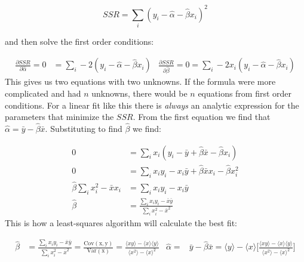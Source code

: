 \begin{equation}
SSR = \sum_i (y_i - \hat \alpha - \hat \beta x_i)^2
\end{equation}

and then solve the first order conditions:

\begin{align}
\frac{\partial SSR}{\partial \hat \alpha} = 0 &= \sum_i -2(y_i - \hat \alpha - \hat \beta x_i) & \frac{\partial SSR}{\partial \hat \beta} =0 =  \sum_i -2x_i (y_i - \hat \alpha - \hat \beta x_i) 
\end{align}
This gives us two equations with two unknowns. If the formula were more complicated and had $n$ unknowns, there would be $n$ equations from first order conditions. For a linear fit like this there is \emph{always} an analytic expression for the parameters that minimize the $SSR$. From the first equation we find that $\hat \alpha = \bar y - \hat \beta \bar x$. Substituting to find $\hat \beta$ we find:

\begin{align*}
0 &=  \sum_i x_i (y_i - \bar y + \hat \beta \bar x - \hat \beta x_i) \\
0 &=  \sum_i x_i y_i - x_i \bar y +\hat \beta \bar xx_i - \hat \beta x_i^2 \\
\hat \beta \sum_i   x_i^2 - \bar xx_i  &= \sum_i x_i y_i - x_i \bar y \\
\hat \beta &= \frac{\sum_i x_i y_i - \bar x \bar y}{\sum_i   x_i^2 - \bar x^2}
\end{align*}
This is how a least-squares algorithm will calculate the best fit:
\begin{framed}
\begin{align}
\hat \beta &= \frac{\sum_i x_i y_i - \bar x \bar y}{\sum_i   x_i^2 - \bar x^2} = \frac{\mathrm{Cov(x,y)}}{\mathrm{Var(x)}} = \frac{\langle xy\rangle-  \langle x \rangle\langle y \rangle}{\langle x^2\rangle-  \langle x \rangle^2}     & \hat \alpha =& \bar y - \hat \beta \bar x = \langle y \rangle - \langle x \rangle \bigg [\frac{\langle xy\rangle-  \langle x \rangle\langle y \rangle}{\langle x^2\rangle-  \langle x \rangle^2} \bigg]
\end{align}
\end{framed}

